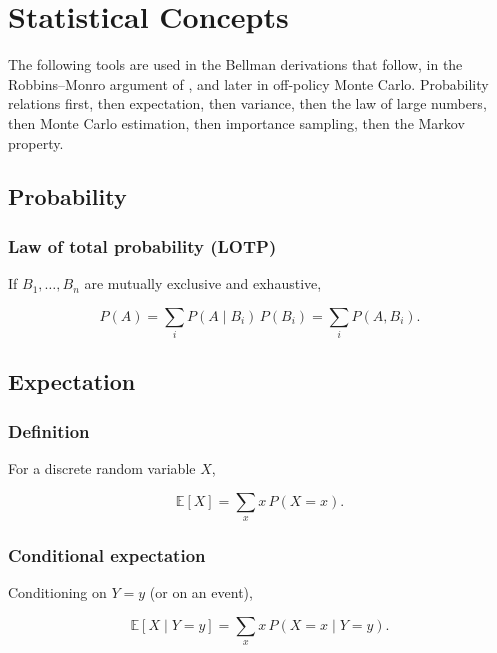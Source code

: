 \chapter{Statistical Concepts}\label{app:A}

The following tools are used in the Bellman derivations that follow, in the Robbins--Monro argument of , and later in off-policy Monte Carlo. Probability relations first, then expectation, then variance, then the law of large numbers, then Monte Carlo estimation, then importance sampling, then the Markov property.

\section{Probability}

\subsection{Law of total probability (LOTP)}

If $B_1,\ldots,B_n$ are mutually exclusive and exhaustive,

\begin{equation}
P(A)
=
\sum_i P(A\mid B_i)\, P(B_i)
=
\sum_i P(A, B_i).
\tag{A.1}
\end{equation}

\section{Expectation}

\subsection{Definition}

For a discrete random variable $X$,

\begin{equation}
\mathbb{E}[X]
=
\sum_x x\, P(X=x).
\tag{A.2}
\end{equation}

\subsection{Conditional expectation}

Conditioning on $Y=y$ (or on an event),

\begin{equation}
\mathbb{E}[X\mid Y=y]
=
\sum_x x\, P(X=x\mid Y=y).
\tag{A.3}
\end{equation}

